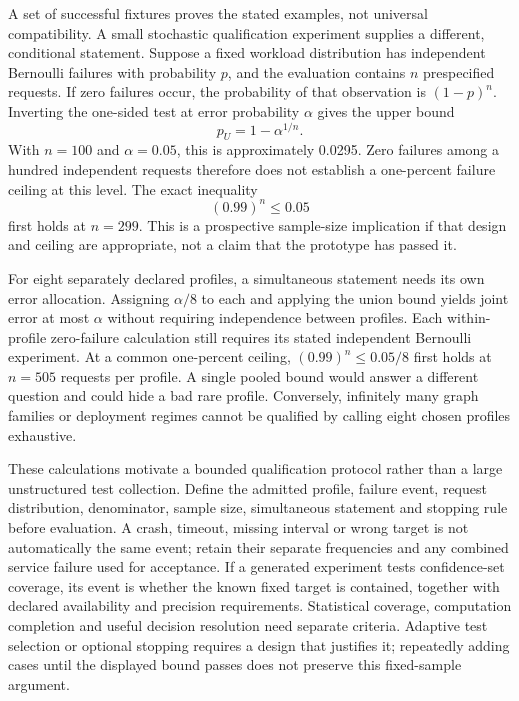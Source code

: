 A set of successful fixtures proves the stated examples, not universal
compatibility. A small stochastic qualification experiment supplies a
different, conditional statement. Suppose a fixed workload distribution has
independent Bernoulli failures with probability \(p\), and the evaluation
contains \(n\) prespecified requests. If zero failures occur, the probability
of that observation is \((1-p)^n\). Inverting the one-sided test at error
probability \(\alpha\) gives the upper bound
\[
 p_U=1-\alpha^{1/n}.
\]
With \(n=100\) and \(\alpha=0.05\), this is approximately 0.0295. Zero failures
among a hundred independent requests therefore does not establish a one-percent
failure ceiling at this level. The exact inequality
\[
 (0.99)^n\leq0.05
\]
first holds at \(n=299\). This is a prospective sample-size implication if
that design and ceiling are appropriate, not a claim that the prototype has
passed it.
\citep{exec16_s10_exact}

For eight separately declared profiles, a simultaneous statement needs its
own error allocation. Assigning \(\alpha/8\) to each and applying the union
bound yields joint error at most \(\alpha\) without requiring independence
between profiles. Each within-profile zero-failure calculation still requires
its stated independent Bernoulli experiment. At a common one-percent ceiling,
\((0.99)^n\leq0.05/8\) first holds at \(n=505\) requests per profile. A single
pooled bound would answer a different question and could hide a bad rare
profile. Conversely, infinitely many graph families or deployment regimes
cannot be qualified by calling eight chosen profiles exhaustive.
\citep{exec16_s10_exact}

These calculations motivate a bounded qualification protocol rather than a
large unstructured test collection. Define the admitted profile, failure event,
request distribution, denominator, sample size, simultaneous statement and
stopping rule before evaluation. A crash, timeout, missing interval or wrong
target is not automatically the same event; retain their separate frequencies
and any combined service failure used for acceptance. If a generated experiment
tests confidence-set coverage, its event is whether the known fixed target is
contained, together with declared availability and precision requirements.
Statistical coverage, computation completion and useful decision resolution
need separate criteria. Adaptive test selection or optional stopping requires
a design that justifies it; repeatedly adding cases until the displayed bound
passes does not preserve this fixed-sample argument.

